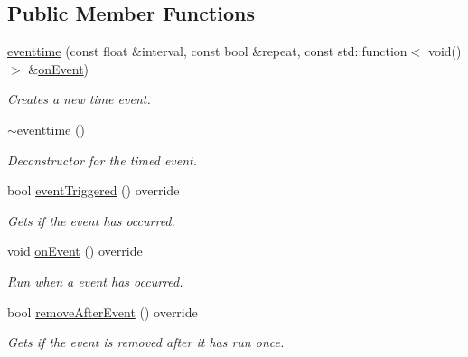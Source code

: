 \subsection*{Public Member Functions}
\begin{DoxyCompactItemize}
\item 
\hyperlink{classflounder_1_1eventtime_a20972724acf2b8b681a1754d59adeff3}{eventtime} (const float \&interval, const bool \&repeat, const std\+::function$<$ void()$>$ \&\hyperlink{classflounder_1_1eventtime_a1b066c00fa959786bb1e9bbd1d212691}{on\+Event})
\begin{DoxyCompactList}\small\item\em Creates a new time event. \end{DoxyCompactList}\item 
\hyperlink{classflounder_1_1eventtime_a30e85c8870687c7b8fabaf6496381366}{$\sim$eventtime} ()
\begin{DoxyCompactList}\small\item\em Deconstructor for the timed event. \end{DoxyCompactList}\item 
bool \hyperlink{classflounder_1_1eventtime_a67a616128c8e4701f7e229172c5e80a5}{event\+Triggered} () override
\begin{DoxyCompactList}\small\item\em Gets if the event has occurred. \end{DoxyCompactList}\item 
void \hyperlink{classflounder_1_1eventtime_a1b066c00fa959786bb1e9bbd1d212691}{on\+Event} () override
\begin{DoxyCompactList}\small\item\em Run when a event has occurred. \end{DoxyCompactList}\item 
bool \hyperlink{classflounder_1_1eventtime_ad765cd1e3b8fe2bf95f2290f5c625af1}{remove\+After\+Event} () override
\begin{DoxyCompactList}\small\item\em Gets if the event is removed after it has run once. \end{DoxyCompactList}\end{DoxyCompactItemize}
